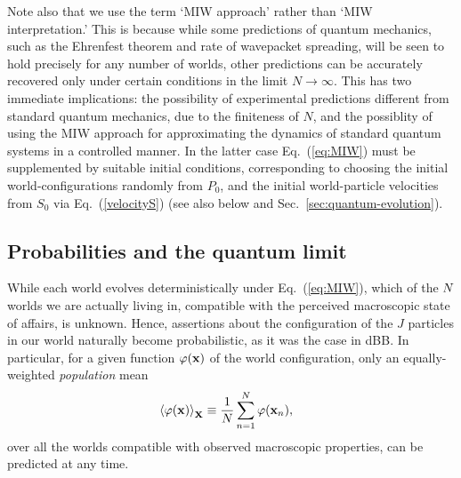 \documentclass[twocolumn,aps,pra,amsmath,amssymb,superscriptaddress]{revtex4}
\newcommand{\an}[1]{\left\langle{#1}\right\rangle}
\renewcommand{\(}{\left(}
\renewcommand{\)}{\right)}
\newcommand{\blk}{\color{black}}
\begin{document}
Note also that we use the term `MIW approach' rather than `MIW interpretation.'
This is because while some predictions of quantum mechanics, such as the
Ehrenfest theorem and rate of  wavepacket  spreading, will be seen to hold
precisely for any number of worlds, other predictions can be accurately
recovered only  under certain conditions \blk in the limit $N\to\infty$.  This has two immediate implications:
the possibility of experimental predictions different from standard quantum
mechanics, due to the finiteness of $N$, and the possiblity of using the MIW
approach for approximating the dynamics of standard quantum systems in a
controlled manner. In the latter case  Eq.~(\ref{eq:MIW}) \blk must be
supplemented by suitable initial conditions, corresponding to choosing the
initial world-configurations randomly from $P_0$, and the initial world-particle
velocities from $S_0$ via  Eq.~(\ref{velocityS}) \blk (see also below and
 Sec.~\ref{sec:quantum-evolution}\blk).
\blk

\subsection{Probabilities and the quantum limit}\label{sec:limit}

While each world evolves deterministically under  Eq.~(\ref{eq:MIW})\blk, which
of the ${  N\blk}$ worlds we are actually living in, compatible with the
perceived macroscopic state of affairs, is unknown.  Hence, assertions about
the configuration of the  $J$ \blk particles in our world naturally become
probabilistic, as it was the case in dBB.  In particular, for a given function
${\varphi}({\bf x})$ of the world configuration, only an equally-weighted {\em
population} mean \blk  
\begin{align} \label{expec}
&\an{\varphi({\bf x})}_{\bf X} \equiv \blk \frac{1}{N} \sum_{n=1}^N {\varphi}({\bf x}_n) ,
\end{align}
over all the worlds compatible with observed macroscopic properties, can be
predicted at any time.
\end{document}
